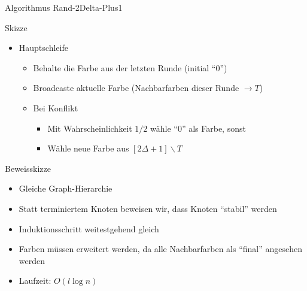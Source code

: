 \documentclass[18pt]{beamer}
\begin{document}
\begin{frame}{Algorithmus Rand-2Delta-Plus1}
	\begin{exampleblock}{Skizze}
	  \begin{itemize}[<+->]
			\item Hauptschleife
			\begin{itemize}
				\item Behalte die Farbe aus der letzten Runde (initial "`0"')
				\item Broadcaste aktuelle Farbe (Nachbarfarben dieser Runde $\rightarrow T$)
				\item Bei Konflikt 
				\begin{itemize}
					\item Mit Wahrscheinlichkeit $1/2$ wähle "`0"' als Farbe, sonst
					\item Wähle neue Farbe aus $[2\Delta+1] \backslash T$
				\end{itemize}
			\end{itemize}
		\end{itemize}
	\end{exampleblock}
\end{frame}

\begin{frame}{Beweisskizze}
	\begin{itemize}
		\item Gleiche Graph-Hierarchie
		\pause
		\item Statt terminiertem Knoten beweisen wir, dass Knoten "`stabil"' werden
		\pause
		\item Induktionsschritt weitestgehend gleich
		\pause
		\item Farben müssen erweitert werden, da alle Nachbarfarben als "`final"' angesehen werden
		\pause
		\item Laufzeit: $O(l \log n)$
	\end{itemize}
\end{frame}
\end{document}
